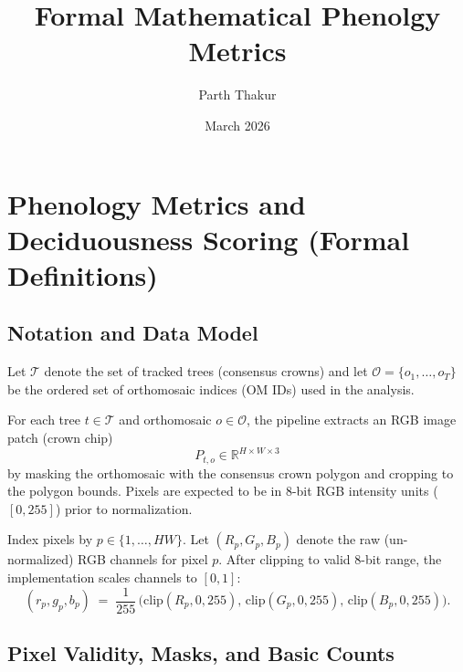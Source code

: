 \documentclass{article}
\title{Formal Mathematical Phenolgy Metrics}
\author{Parth Thakur}
\date{March 2026}
\begin{document}
\maketitle

\section{Phenology Metrics and Deciduousness Scoring (Formal Definitions)}
\label{sec:phenology-formal}


\subsection{Notation and Data Model}

Let $\mathcal{T}$ denote the set of tracked trees (consensus crowns) and let $\mathcal{O}=\{o_1,\dots,o_T\}$
be the ordered set of orthomosaic indices (OM IDs) used in the analysis.

For each tree $t\in\mathcal{T}$ and orthomosaic $o\in\mathcal{O}$, the pipeline extracts an RGB image patch
(crown chip)
\begin{equation}
P_{t,o}\in\mathbb{R}^{H\times W\times 3}
\end{equation}
by masking the orthomosaic with the consensus crown polygon and cropping to the polygon bounds.
Pixels are expected to be in 8-bit RGB intensity units ($[0,255]$) prior to normalization.

Index pixels by $p\in\{1,\dots,HW\}$. Let $(R_p,G_p,B_p)$ denote the raw (un-normalized) RGB channels for pixel $p$.
After clipping to valid 8-bit range, the implementation scales channels to $[0,1]$:
\begin{equation}
(r_p,g_p,b_p) \;=\; \frac{1}{255}\,\bigl(\mathrm{clip}(R_p,0,255),\,\mathrm{clip}(G_p,0,255),\,\mathrm{clip}(B_p,0,255)\bigr).
\end{equation}

\subsection{Pixel Validity, Masks, and Basic Counts}
\end{document}
